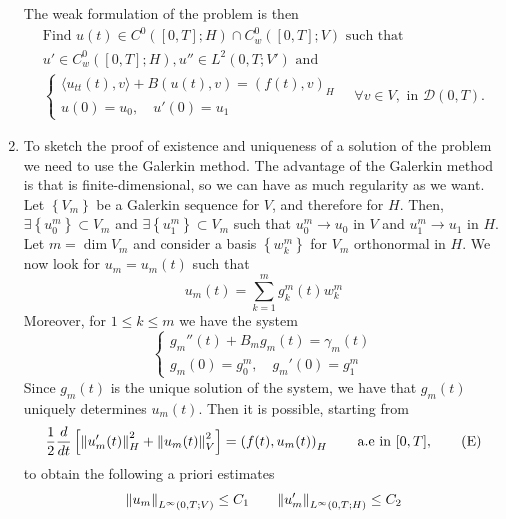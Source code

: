 \begin{enumerate}
          The weak formulation of the problem is then
          \[
              \begin{split}
                  \text{Find } u(t) \in C^0([0, T]; H) \cap C_w^0([0, T]; V) \text{ such that } \\
                  u' \in C_w^0([0, T]; H), u'' \in L^2(0, T; V') \text{ and }                   \\
                  \begin{cases}
                      \langle u_{tt}(t), v \rangle + B(u(t), v) = (f(t), v)_H \\
                      u(0) = u_0, \quad u'(0) = u_1
                  \end{cases}\quad \forall v \in V, \text{ in } \mathcal{D}(0, T).
              \end{split}
          \]
    \item To sketch the proof of existence and uniqueness of a solution of the problem we
          need to use the Galerkin method. The advantage of the Galerkin method is that
          is finite-dimensional, so we can have as much regularity as we want. Let
          \(\left\{V_m\right\}\) be a Galerkin sequence for \(V\), and therefore for
          \(H\). Then, \(\exists \left\{u_0^m\right\} \subset V_m\) and \(\exists
          \left\{u_1^m\right\} \subset V_m\) such that \(u_0^m \to u_0\) in \(V\) and
          \(u_1^m \to u_1\) in \(H\). Let \(m = \dim V_m\) and consider a basis
          \(\left\{w_k^m\right\}\) for \(V_m\) orthonormal in \(H\). We now look for
          \(u_m = u_m(t)\) such that
          \[
              u_m(t) = \sum_{k=1}^m g_k^m(t) w_k^m
          \]
          Moreover, for \(1 \leq k \leq m\) we have the system
          \[
              \begin{cases}
                  g_m''(t) + B_m g_m(t) = \gamma_m(t) \\
                  g_m(0) = g_0^m, \quad g_m'(0) = g_1^m
              \end{cases}
          \]
          Since \(g_m(t)\) is the unique solution of the system, we have that \(g_m(t)\)
          uniquely determines \(u_m(t)\). Then it is possible, starting from
          \[
              \frac{1}{2}\frac{d}{dt} \left[\norm{u_m'(t)}_H^2 + \norm{u_m(t)}_V^2\right] = \left(f(t), u_m(t)\right)_H \qquad \text{a.e in } [0, T],
              \tag*{(E)}
          \]
          to obtain the following a priori estimates
          \[
              \norm{u_m}_{L^\infty(0, T; V)} \leq C_1 \qquad \norm{u_m'}_{L^\infty(0, T; H)} \leq C_2
\]
\end{enumerate}
